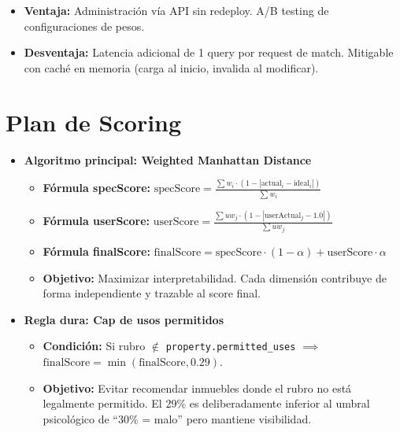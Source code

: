 \documentclass[11pt,a4paper]{article}
\begin{document}
\begin{itemize}
    \item \textbf{Ventaja:} Administración vía API sin redeploy. A/B testing de configuraciones de pesos.
    \item \textbf{Desventaja:} Latencia adicional de 1 query por request de match. Mitigable con caché en memoria (carga al inicio, invalida al modificar).
\end{itemize}

\section{Plan de Scoring}
\begin{itemize}
    \item \textbf{Algoritmo principal: Weighted Manhattan Distance}
    \begin{itemize}
        \item \textbf{Fórmula specScore:} $\text{specScore} = \frac{\sum w_i \cdot (1 - |\text{actual}_i - \text{ideal}_i|)}{\sum w_i}$
        \item \textbf{Fórmula userScore:} $\text{userScore} = \frac{\sum uw_j \cdot (1 - |\text{userActual}_j - 1.0|)}{\sum uw_j}$
        \item \textbf{Fórmula finalScore:} $\text{finalScore} = \text{specScore} \cdot (1 - \alpha) + \text{userScore} \cdot \alpha$
        \item \textbf{Objetivo:} Maximizar interpretabilidad. Cada dimensión contribuye de forma independiente y trazable al score final.
    \end{itemize}
    \item \textbf{Regla dura: Cap de usos permitidos}
    \begin{itemize}
        \item \textbf{Condición:} Si rubro $\notin$ \texttt{property.permitted\_uses} $\implies$ $\text{finalScore} = \min(\text{finalScore}, 0.29)$.
        \item \textbf{Objetivo:} Evitar recomendar inmuebles donde el rubro no está legalmente permitido. El 29\% es deliberadamente inferior al umbral psicológico de ``30\% = malo'' pero mantiene visibilidad.
    \end{itemize}
\end{itemize}
\end{document}
